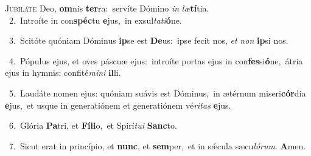 \lettrine{\initial\textcolor{\initialcolor}{J}}{ubiláte} Deo, \textbf{om}\-nis \textbf{ter}\-ra:~\star servíte Dómino \textit{in} \textit{læ}\-\textbf{tí}tia.\\
{\numbfont\textcolor{\numbcolor}{~2.}}~Introíte in con\-\textbf{spéc}\-tu \textbf{e}\-jus,~\star in exsul\-\textit{ta}\-\textit{ti}\textbf{ó}ne.\par
{\numbfont\textcolor{\numbcolor}{~3.}}~Scitóte quóniam Dóminus \textbf{ip}\-se est \textbf{De}\-us:~\star ipse fecit nos, \textit{et} \textit{non} \textbf{ip}\-si nos.\par
{\numbfont\textcolor{\numbcolor}{~4.}}~Pópulus ejus, et oves páscuæ ejus:~\dagger introíte portas ejus in con\-\textbf{fes}\-si\-\textbf{ó}\-ne,~\star átria ejus in hymnis: confité\-\textit{mi}\-\textit{ni} \textbf{il}\-li.\par
{\numbfont\textcolor{\numbcolor}{~5.}}~Laudáte nomen ejus: quóniam suávis est Dóminus,~\dagger in ætérnum miseri\-\textbf{cór}\-dia \textbf{e}\-jus,~\star et usque in generatiónem et generatiónem vé\-\textit{ri}\-\textit{tas} \textbf{e}\-jus.\par
{\numbfont\textcolor{\numbcolor}{~6.}}~Glória \textbf{Pa}\-tri, et \textbf{Fí}\-\textbf{li}o,~\star et Spirí\-\textit{tu}\-\textit{i} \textbf{Sanc}\-to.\par
{\numbfont\textcolor{\numbcolor}{~7.}}~Sicut erat in princípio, et \textbf{nunc}\-, et \textbf{sem}\-per,~\star et in sǽcula sæcu\-\textit{ló}\-\textit{rum}. \textbf{A}\-men.\par
